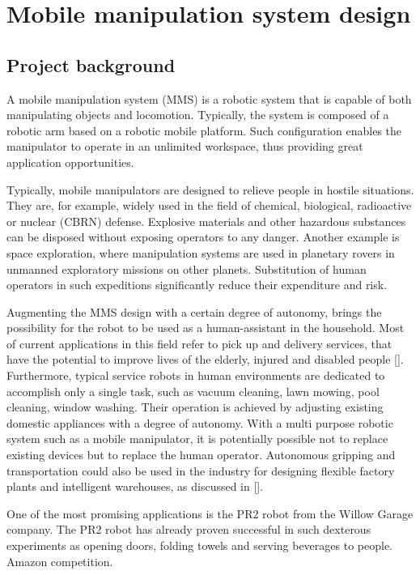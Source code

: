 \chapter{Mobile manipulation system design}
\label{cha:mmsdesign}


\section{Project background}
\label{sec:background}

A mobile manipulation system (MMS) is a robotic system that is capable of both manipulating objects and locomotion. Typically, the system is composed of a robotic arm based on a robotic mobile platform. Such configuration enables the manipulator to operate in an unlimited workspace, thus providing great application opportunities.

Typically, mobile manipulators are designed to relieve people in hostile situations. They are, for example, widely used in the field of chemical, biological, radioactive or nuclear (CBRN) defense. Explosive materials and other hazardous substances can be disposed without exposing operators to any danger. Another example is space exploration, where manipulation systems are used in planetary rovers in unmanned exploratory missions on other planets. Substitution of human operators in such expeditions significantly reduce their expenditure and risk.

Augmenting the MMS design with a certain degree of autonomy, brings the possibility for the robot to be used as a human-assistant in the household. Most of current applications in this field refer to pick up and delivery services, that have the potential to improve lives of the elderly, injured and disabled people []. Furthermore, typical service robots in human environments are dedicated to accomplish only a single task, such as vacuum cleaning, lawn mowing, pool cleaning, window washing. Their operation is achieved by adjusting existing domestic appliances with a degree of autonomy. With a multi purpose robotic system such as a mobile manipulator, it is potentially possible not to replace existing devices but to replace the human operator. Autonomous gripping and transportation could also be used in the industry for designing flexible factory plants and intelligent warehouses, as discussed in []. 

One of the most promising applications is the PR2 robot from the Willow Garage company. The PR2 robot has already proven successful in such dexterous experiments as opening doors, folding towels and serving beverages to people.  Amazon competition.

